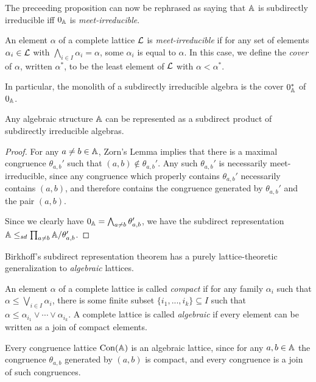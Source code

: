 \begin{appendices}
The preceeding proposition can now be rephrased as saying that $\mathbb{A}$ is subdirectly irreducible iff $0_{\mathbb{A}}$ is \emph{meet-irreducible}.

\begin{defn} An element $\alpha$ of a complete lattice $\mathcal{L}$ is \emph{meet-irreducible} if for any set of elements $\alpha_i \in \mathcal{L}$ with $\bigwedge_{i \in I} \alpha_i = \alpha$, some $\alpha_i$ is equal to $\alpha$. In this case, we define the \emph{cover} of $\alpha$, written $\alpha^*$, to be the least element of $\mathcal{L}$ with $\alpha < \alpha^*$.
\end{defn}

In particular, the monolith of a subdirectly irreducible algebra is the cover $0_{\mathbb{A}}^*$ of $0_{\mathbb{A}}$.

\begin{thm} Any algebraic structure $\mathbb{A}$ can be represented as a subdirect product of subdirectly irreducible algebras.
\end{thm}
\begin{proof} For any $a\ne b \in \mathbb{A}$, Zorn's Lemma implies that there is a maximal congruence $\theta_{a,b}'$ such that $(a,b) \not\in \theta_{a,b}'$. Any such $\theta_{a,b}'$ is necessarily meet-irreducible, since any congruence which properly contains $\theta_{a,b}'$ necessarily contains $(a,b)$, and therefore contains the congruence generated by $\theta_{a,b}'$ and the pair $(a,b)$.

Since we clearly have $0_{\mathbb{A}} = \bigwedge_{a \ne b} \theta_{a,b}'$, we have the subdirect representation $\mathbb{A} \le_{sd} \prod_{a \ne b} \mathbb{A}/\theta_{a,b}'$.
\end{proof}

Birkhoff's subdirect representation theorem has a purely lattice-theoretic generalization to \emph{algebraic} lattices.

\begin{defn}\label{defn-algebraic-lattice} An element $\alpha$ of a complete lattice is called \emph{compact} if for any family $\alpha_i$ such that $\alpha \le \bigvee_{i \in I} \alpha_i$, there is some finite subset $\{i_1, ..., i_k\} \subseteq I$ such that $\alpha \le \alpha_{i_1} \vee \cdots \vee \alpha_{i_k}$. A complete lattice is called \emph{algebraic} if every element can be written as a join of compact elements.
\end{defn}

Every congruence lattice $\operatorname{Con}(\mathbb{A})$ is an algebraic lattice, since for any $a,b \in \mathbb{A}$ the congruence $\theta_{a,b}$ generated by $(a,b)$ is compact, and every congruence is a join of such congruences.


\end{appendices}

